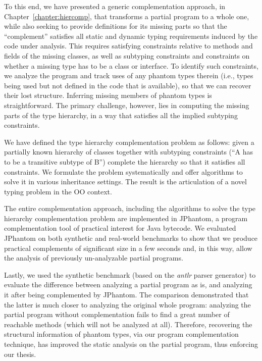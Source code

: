 To this end, we have presented a generic complementation approach, in
Chapter~\ref{chapter:hiercomp}, that transforms a partial program to a
whole one, while also seeking to provide definitions for its missing
parts so that the ``complement'' satisfies all static and dynamic
typing requirements induced by the code under analysis. This requires
satisfying constraints relative to methods and fields of the missing
classes, as well as subtyping constraints and constraints on whether a
missing type has to be a class or interface.
%
To identify such constraints, we analyze the program and track uses
of any phantom types therein (i.e., types being used but not defined
in the code that is available), so that we can recover their
lost structure. Inferring missing members of phantom types is
straightforward. The primary challenge, however, lies in computing the
missing parts of the type hierarchy, in a way that satisfies all the
implied subtyping constraints.

We have defined the type hierarchy complementation problem as follows:
given a partially known hierarchy of classes together with subtyping
constraints (``A has to be a transitive subtype of B'') complete the
hierarchy so that it satisfies all constraints. We formulate the
problem systematically and offer algorithms to solve it in various
inheritance settings. The result is the articulation of a novel typing
problem in the OO context.

The entire complementation approach, including the algorithms to solve
the type hierarchy complementation problem are implemented in
JPhantom, a program complementation tool of practical interest for
Java bytecode.
%
We evaluated JPhantom on both synthetic and real-world benchmarks to
show that we produce practical complements of significant size in a
few seconds and, in this way, allow the analysis of previously
un-analyzable partial programs.

Lastly, we used the synthetic benchmark (based on the \emph{antlr}
parser generator) to evaluate the difference between analyzing a
partial program as is, and analyzing it after being complemented by
JPhantom. The comparison demonstrated that the latter is much closer
to analyzing the original whole program: analyzing the partial program
without complementation fails to find a great number of reachable
methods (which will not be analyzed at all). Therefore, recovering the
structural information of phantom types, via our program
complementation technique, has improved the static analysis on the
partial program, thus enforcing our thesis.

